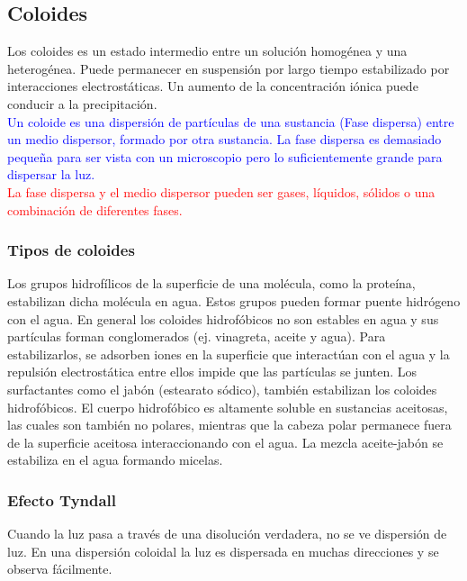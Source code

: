     \subsection{Coloides}
        \sangria{} Los coloides es un estado intermedio entre un solución homogénea y una heterogénea. Puede permanecer en suspensión por largo tiempo estabilizado por interacciones electrostáticas. Un aumento de la concentración iónica puede conducir a la precipitación. \\
        \textcolor{blue}{Un coloide es una dispersión de partículas de una sustancia (Fase dispersa) entre un medio dispersor, formado por otra sustancia. La fase dispersa es demasiado pequeña para ser vista con un microscopio pero lo suficientemente grande para dispersar la luz.} \\
        \textcolor{red}{La fase dispersa y el medio dispersor pueden ser gases, líquidos, sólidos o una combinación de diferentes fases.} \\
        \subsubsection{Tipos de coloides}
            \sangria{}Los grupos hidrofílicos de la superficie de una molécula, como la proteína, estabilizan dicha molécula en agua. Estos grupos pueden formar puente hidrógeno con el agua.
            \saltoPag{}
            \sangria{} En general los coloides hidrofóbicos no son estables en agua y sus partículas forman conglomerados (ej. vinagreta, aceite y agua). Para estabilizarlos, se adsorben iones en la superficie que interactúan con el agua y la repulsión electrostática entre ellos impide que las partículas se junten.
            \sangria{} Los surfactantes como el jabón (estearato sódico), también estabilizan los coloides hidrofóbicos. El cuerpo hidrofóbico es altamente soluble en sustancias aceitosas, las cuales son también no polares, mientras que la cabeza polar permanece fuera de la superficie aceitosa interaccionando con el agua. La mezcla aceite-jabón se estabiliza en el agua formando micelas.
    \subsubsection{Efecto Tyndall}
        \sangria{} Cuando la luz pasa a través de una disolución verdadera, no se ve dispersión de luz. En una dispersión coloidal la luz es dispersada en muchas direcciones y se observa fácilmente.


